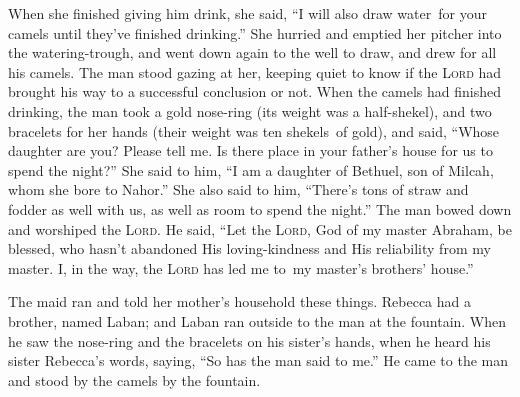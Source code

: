 \begin{inparaenum}
     When she finished giving him drink, she said, ``I will also draw water\understood\ for your camels until they've finished drinking.''%
     She hurried and emptied her pitcher into the watering-trough, and went down again to the well to draw, and drew for all his camels.%
     The man stood gazing at her, keeping quiet to know if the \textsc{Lord} had brought his way to a successful conclusion or not.%
     When the camels had finished drinking, the man took a gold nose-ring (its weight was a half-shekel), and two bracelets for her hands (their weight was ten shekels\understood\ of gold),%
     and said, ``Whose daughter are you? Please tell me. Is there place in your father's house for us to spend the night?''%
     She said to him, ``I am a daughter of Bethuel, son of Milcah, whom she bore to Nahor.''%
     She also said to him, ``There's tons of straw and fodder as well with us, as well as room to spend the night.''%
     The man bowed down and worshiped the \textsc{Lord}.%
     He said, ``Let the \textsc{Lord}, God of my master Abraham, be blessed, who hasn't abandoned His loving-kindness and His reliability from my master. I, in the way, the \textsc{Lord} has led me to\understood\ my master's brothers' house.''%
    
     The maid ran and told her mother's household these things.%
     Rebecca had a brother, named Laban; and Laban ran outside to the man at the fountain.%
     When he saw the nose-ring and the bracelets on his sister's hands, when he heard his sister Rebecca's words, saying, ``So has the man said to me.'' He came to the man and stood by the camels by the fountain.%
    

\end{inparaenum}
